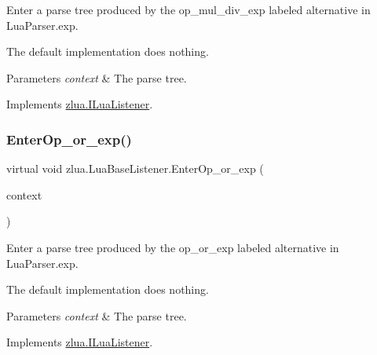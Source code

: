 Enter a parse tree produced by the {\ttfamily op\+\_\+mul\+\_\+div\+\_\+exp} labeled alternative in Lua\+Parser.\+exp. 

The default implementation does nothing.


\begin{DoxyParams}{Parameters}
{\em context} & The parse tree.\\
\hline
\end{DoxyParams}


Implements \mbox{\hyperlink{interfacezlua_1_1_i_lua_listener_adceb73b6f7d7f84737f72b1a5c5fe4d6}{zlua.\+I\+Lua\+Listener}}.

\mbox{\label{classzlua_1_1_lua_base_listener_ad05798f5b17c22a225fe160a5230d82c}} 
\subsubsection{\texorpdfstring{Enter\+Op\+\_\+or\+\_\+exp()}{EnterOp\_or\_exp()}}
{\footnotesize\ttfamily virtual void zlua.\+Lua\+Base\+Listener.\+Enter\+Op\+\_\+or\+\_\+exp (\begin{DoxyParamCaption}\item[{\mbox{[}\+Not\+Null\mbox{]} \mbox{\hyperlink{classzlua_1_1_lua_parser_1_1_op__or__exp_context}{Lua\+Parser.\+Op\+\_\+or\+\_\+exp\+Context}}}]{context }\end{DoxyParamCaption})\hspace{0.3cm}{\ttfamily [virtual]}}



Enter a parse tree produced by the {\ttfamily op\+\_\+or\+\_\+exp} labeled alternative in Lua\+Parser.\+exp. 

The default implementation does nothing.


\begin{DoxyParams}{Parameters}
{\em context} & The parse tree.\\
\hline
\end{DoxyParams}


Implements \mbox{\hyperlink{interfacezlua_1_1_i_lua_listener_a51c92b24a1ae3217599c08d098f351e8}{zlua.\+I\+Lua\+Listener}}.

\mbox{\label{classzlua_1_1_lua_base_listener_ad4db24437ff42fb074c69313ec11818d}} 
